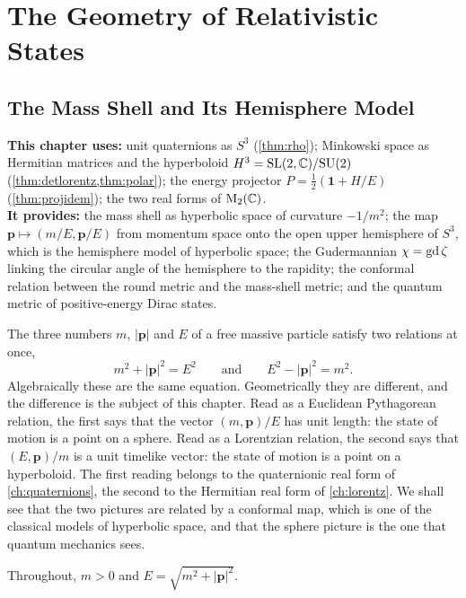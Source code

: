 \part{The Geometry of Relativistic States}

\chapter{The Mass Shell and Its Hemisphere Model}
\label{ch:hemisphere}

\begin{usesbox}
\textbf{This chapter uses:} unit quaternions as $S^3$ (\cref{thm:rho}); Minkowski space as Hermitian matrices and the hyperboloid $H^3=\mathrm{SL}(2,\mathbb{C})/\mathrm{SU}(2)$ (\cref{thm:detlorentz,thm:polar}); the energy projector $P=\frac12(\mathbf 1+H/E)$ (\cref{thm:projidem}); the two real forms of $\mathrm{M}_2(\mathbb{C})$.\\
\textbf{It provides:} the mass shell as hyperbolic space of curvature $-1/m^2$; the map $\mathbf p\mapsto(m/E,\mathbf p/E)$ from momentum space onto the open upper hemisphere of $S^3$, which is the hemisphere model of hyperbolic space; the Gudermannian $\chi=\operatorname{gd}\zeta$ linking the circular angle of the hemisphere to the rapidity; the conformal relation between the round metric and the mass-shell metric; and the quantum metric of positive-energy Dirac states.
\end{usesbox}

The three numbers $m$, $|\mathbf p|$ and $E$ of a free massive particle satisfy two relations at once,
\begin{equation}\label{eq:twopythagoras}
m^2+|\mathbf p|^2=E^2\qquad\text{and}\qquad E^2-|\mathbf p|^2=m^2 .
\end{equation}
Algebraically these are the same equation. Geometrically they are different, and the difference is the subject of this chapter. Read as a Euclidean Pythagorean relation, the first says that the vector $(m,\mathbf p)/E$ has unit length: the state of motion is a point on a sphere. Read as a Lorentzian relation, the second says that $(E,\mathbf p)/m$ is a unit timelike vector: the state of motion is a point on a hyperboloid. The first reading belongs to the quaternionic real form of \cref{ch:quaternions}, the second to the Hermitian real form of \cref{ch:lorentz}. We shall see that the two pictures are related by a conformal map, which is one of the classical models of hyperbolic space, and that the sphere picture is the one that quantum mechanics sees.

Throughout, $m>0$ and $E=\sqrt{m^2+|\mathbf p|^2}$.

